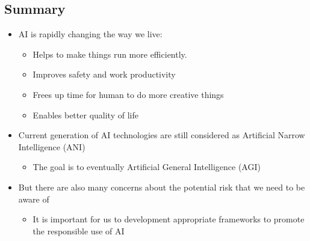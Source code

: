 \documentclass[11pt]{article}
\begin{document}
 \newpage

\subsection{Summary}
\label{sec:org1536906}
\begin{itemize}
\item AI is rapidly changing the way we live:
\begin{itemize}
\item Helps to make things run more efficiently.
\item Improves safety and work productivity
\item Frees up time for human to do more creative things
\item Enables better quality of life
\end{itemize}
\item Current generation of AI technologies are still considered as Artificial Narrow Intelligence (ANI)
\begin{itemize}
\item The goal is to eventually Artificial General Intelligence (AGI)
\end{itemize}
\item But there are also many concerns about the potential risk that we need to be aware of
\begin{itemize}
\item It is important for us to development appropriate frameworks to promote the responsible use of AI
\end{itemize}
\end{itemize}
\end{document}
